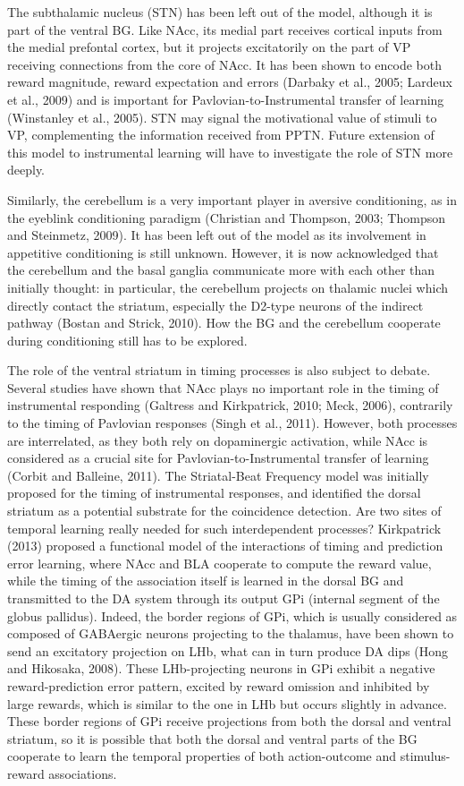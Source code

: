 \documentclass[
  11pt,
  a4paper,
]{scrbook}
\begin{document}
The subthalamic nucleus (STN) has been left out of the model, although
it is part of the ventral BG. Like NAcc, its medial part receives
cortical inputs from the medial prefontal cortex, but it projects
excitatorily on the part of VP receiving connections from the core of
NAcc. It has been shown to encode both reward magnitude, reward
expectation and errors (Darbaky et al., 2005; Lardeux et al., 2009) and
is important for Pavlovian-to-Instrumental transfer of learning
(Winstanley et al., 2005). STN may signal the motivational value of
stimuli to VP, complementing the information received from PPTN. Future
extension of this model to instrumental learning will have to
investigate the role of STN more deeply.

Similarly, the cerebellum is a very important player in aversive
conditioning, as in the eyeblink conditioning paradigm (Christian and
Thompson, 2003; Thompson and Steinmetz, 2009). It has been left out of
the model as its involvement in appetitive conditioning is still
unknown. However, it is now acknowledged that the cerebellum and the
basal ganglia communicate more with each other than initially thought:
in particular, the cerebellum projects on thalamic nuclei which directly
contact the striatum, especially the D2-type neurons of the indirect
pathway (Bostan and Strick, 2010). How the BG and the cerebellum
cooperate during conditioning still has to be explored.

The role of the ventral striatum in timing processes is also subject to
debate. Several studies have shown that NAcc plays no important role in
the timing of instrumental responding (Galtress and Kirkpatrick, 2010;
Meck, 2006), contrarily to the timing of Pavlovian responses (Singh et
al., 2011). However, both processes are interrelated, as they both rely
on dopaminergic activation, while NAcc is considered as a crucial site
for Pavlovian-to-Instrumental transfer of learning (Corbit and Balleine,
2011). The Striatal-Beat Frequency model was initially proposed for the
timing of instrumental responses, and identified the dorsal striatum as
a potential substrate for the coincidence detection. Are two sites of
temporal learning really needed for such interdependent processes?
Kirkpatrick (2013) proposed a functional model of the interactions of
timing and prediction error learning, where NAcc and BLA cooperate to
compute the reward value, while the timing of the association itself is
learned in the dorsal BG and transmitted to the DA system through its
output GPi (internal segment of the globus pallidus). Indeed, the border
regions of GPi, which is usually considered as composed of GABAergic
neurons projecting to the thalamus, have been shown to send an
excitatory projection on LHb, what can in turn produce DA dips (Hong and
Hikosaka, 2008). These LHb-projecting neurons in GPi exhibit a negative
reward-prediction error pattern, excited by reward omission and
inhibited by large rewards, which is similar to the one in LHb but
occurs slightly in advance. These border regions of GPi receive
projections from both the dorsal and ventral striatum, so it is possible
that both the dorsal and ventral parts of the BG cooperate to learn the
temporal properties of both action-outcome and stimulus-reward
associations.
\end{document}
